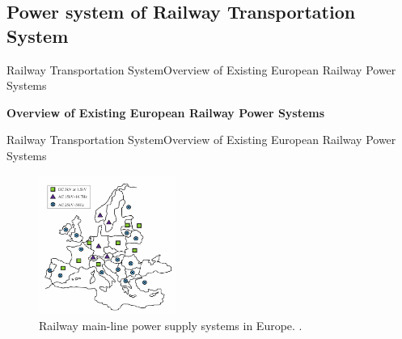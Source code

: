 \subsection{Power system of Railway Transportation System}

\begin{frame}{Railway Transportation System}{Overview of Existing European Railway Power Systems}
	\begin{block}{\textbf{Overview of Existing European Railway Power Systems}}
		
		
		

			

		
	\end{block}
\end{frame}

\begin{frame}{Railway Transportation System}{Overview of Existing European Railway Power Systems}


\begin{figure}[h!]
	\centering
	\includegraphics[width=0.4\textwidth,keepaspectratio]{figures/31.PowerS/abad2016}
	\caption{Railway main-line power supply systems in Europe. \cite{abad2016}.}
	\label{fig:abad2016}
\end{figure}
	
	
\end{frame}

